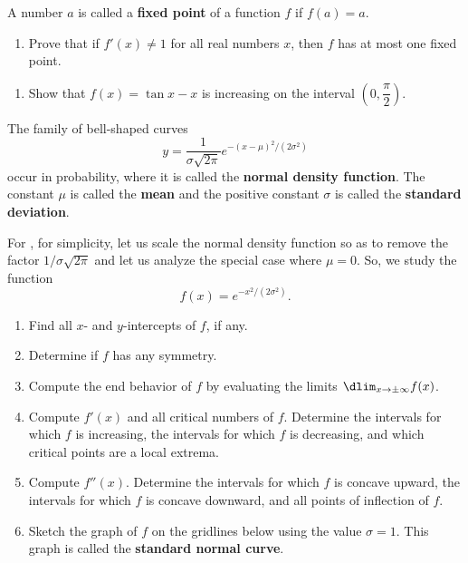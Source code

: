 \documentclass{book}
\begin{document}
\begin{Def}
A number $a$ is called a \textbf{fixed point} of a function $f$ if $f(a) = a$.
\end{Def}\vs
\begin{enumerate}[!HW!]
\item Prove that if $f'(x)\neq 1$ for all real numbers $x$, then $f$ has at most one fixed point.
\end{enumerate}
\begin{enumerate}[!HW!]
\item Show that $f(x) = \tan x- x$ is increasing on the interval $\left(0, \dfrac{\pi}{2}\right)$.
\end{enumerate}
\begin{Def}
The family of bell-shaped curves
\[ y = \dfrac{1}{\sigma\sqrt{2\pi}}e^{-(x-\mu)^2/(2\sigma^2)}\] occur in probability, where it is called the \textbf{normal density function}. The constant $\mu$ is called the \textbf{mean} and the positive constant $\sigma$ is called the \textbf{standard deviation}.
\end{Def}\vs
For , for simplicity, let us scale the normal density function so as to remove the factor $1/\sigma\sqrt{2\pi}$ and let us analyze the special case where $\mu = 0$. So, we study the function 
\[f(x) = e^{-x^2/(2\sigma^2)}.\]
\begin{enumerate}[!HW!]
\item\label{exer:bellcurve:start} Find all $x$- and $y$-intercepts of $f$, if any.
\item Determine if $f$ has any symmetry.
\item Compute the end behavior of $f$ by evaluating the limits $\dlim_{x\to\pm\infty} f(x)$.
\item Compute $f'(x)$ and all critical numbers of $f$. Determine the intervals for which $f$ is increasing, the intervals for which $f$ is decreasing, and which critical points are a local extrema.
\item Compute $f''(x)$. Determine the intervals for which $f$ is concave upward, the intervals for which $f$ is concave downward, and all points of inflection of $f$.
\item\label{exer:bellcurve:stop} Sketch the graph of $f$ on the gridlines below using the value $\sigma=1$. This graph is called the \textbf{standard normal curve}.
\end{enumerate}
\pagebreak
\end{document}
